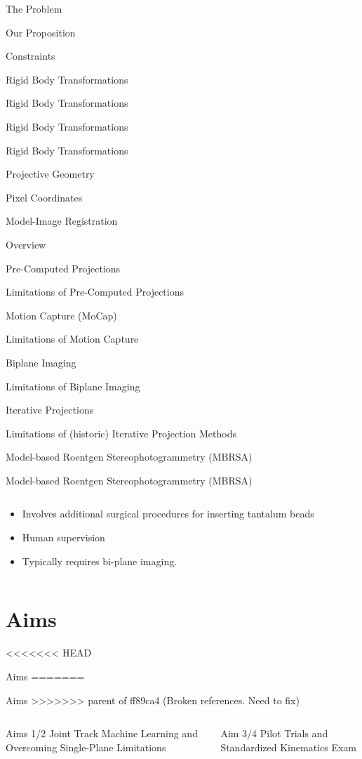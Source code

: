 \documentclass[presentation, aspectratio=1610]{beamer}
\begin{document}
\begin{frame}[label={sec:org51bdd62}]{The Problem}
\begin{frame}[label={sec:org827823c}]{Our Proposition}
\begin{frame}[label={sec:org8655799}]{Constraints}
\begin{frame}[label={sec:orgb624cd0}]{Rigid Body Transformations}
\begin{frame}[label={sec:org66cfa5c}]{Rigid Body Transformations}
\begin{frame}[label={sec:orga8040ec}]{Rigid Body Transformations}
\begin{frame}[label={sec:org2c45bb0}]{Rigid Body Transformations}
\begin{frame}[label={sec:orgc08b8a8}]{Projective Geometry}
\begin{frame}[label={sec:org9004faf}]{Pixel Coordinates}
\begin{frame}[label={sec:orgf5a9f37}]{Model-Image Registration}
\begin{frame}[label={sec:orgd132949}]{Overview}
\begin{frame}[label={sec:org3bacc15}]{Pre-Computed Projections}
\begin{frame}[label={sec:org9c71b5d}]{Limitations of Pre-Computed Projections}
\begin{frame}[label={sec:org0b4ee4b}]{Motion Capture (MoCap)}
\begin{frame}[label={sec:org8d150bb}]{Limitations of Motion Capture}
\begin{frame}[label={sec:orgb0b4d92}]{Biplane Imaging}
\begin{frame}[label={sec:org4d6375c}]{Limitations of Biplane Imaging}
\begin{frame}[label={sec:org2fdd7da}]{Iterative Projections}
\begin{frame}[label={sec:org64525aa}]{Limitations of (historic) Iterative Projection Methods}
\begin{frame}[label={sec:org4dff9c3}]{Model-based Roentgen Stereophotogrammetry (MBRSA)}
\begin{frame}[label={sec:org1844ed1}]{Model-based Roentgen Stereophotogrammetry (MBRSA)}
\begin{columns}
\begin{column}{0.6\columnwidth}
\begin{itemize}
\item Involves additional surgical procedures for inserting tantalum beads
\item Human supervision
\item Typically requires bi-plane imaging.
\end{itemize}
\end{column}
\end{columns}
\end{frame}
\section{Aims}
<<<<<<< HEAD
\label{sec:orgd0d0fe3}
\begin{frame}[label={sec:orgff43572}]{Aims}
=======
\label{sec:org704b485}
\begin{frame}[label={sec:org3326c57}]{Aims}
>>>>>>> parent of ff89ca4 (Broken references. Need to fix)
\begin{columns}
\begin{column}{0.3\columnwidth}
\begin{block}{Aims 1/2}
Joint Track Machine Learning and Overcoming Single-Plane Limitations
\end{block}
\end{column}
\begin{column}{0.3\columnwidth}
\begin{block}{Aim 3/4}
Pilot Trials and Standardized Kinematics Exam
\end{block}
\end{column}

\end{columns}
\end{frame}
\end{frame}
\end{frame}
\end{frame}
\end{frame}
\end{frame}
\end{frame}
\end{frame}
\end{frame}
\end{frame}
\end{frame}
\end{frame}
\end{frame}
\end{frame}
\end{frame}
\end{frame}
\end{frame}
\end{frame}
\end{frame}
\end{frame}
\end{frame}
\end{frame}
\end{document}
